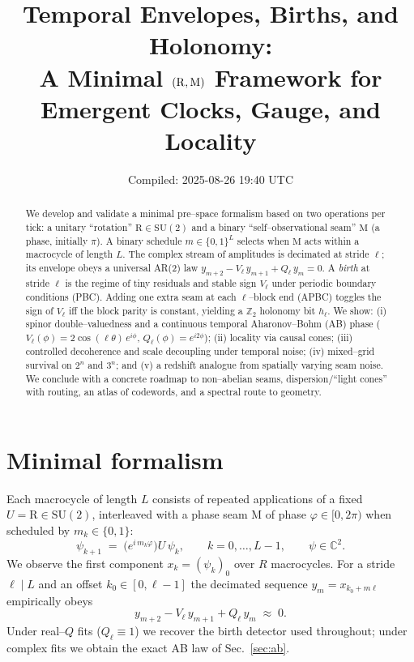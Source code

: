 \documentclass[11pt]{article}
\title{\bf Temporal Envelopes, Births, and Holonomy:\\
A Minimal $(\Rop,\Mop)$ Framework for Emergent Clocks, Gauge, and Locality}
\author{}
\date{Compiled: 2025-08-26 19:40 UTC}
\newcommand{\Z}{\mathbb{Z}}
\newcommand{\Rop}{\mathrm{R}}
\newcommand{\Mop}{\mathrm{M}}
\begin{document}
\maketitle

\begin{abstract}
We develop and validate a minimal pre--space formalism based on two operations per tick: a unitary ``rotation'' $\Rop\in \mathrm{SU}(2)$ and a binary ``self--observational seam'' $\Mop$ (a phase, initially $\pi$). A binary schedule $m\in\{0,1\}^L$ selects when $\Mop$ acts within a macrocycle of length $L$.
The complex stream of amplitudes is decimated at stride $\ell$; its envelope obeys a universal AR(2) law $y_{m+2}-V_\ell\,y_{m+1}+Q_\ell\,y_m=0$.
A \emph{birth} at stride $\ell$ is the regime of tiny residuals and stable sign $V_\ell$ under periodic boundary conditions (PBC). Adding one extra seam at each $\ell$--block end (APBC) toggles the sign of $V_\ell$ iff the block parity is constant, yielding a $\Z_2$ holonomy bit $h_\ell$.
We show: (i) spinor double--valuedness and a continuous temporal Aharonov--Bohm (AB) phase ($V_\ell(\phi)=2\cos(\ell\theta)\,e^{i\phi}$, $Q_\ell(\phi)=e^{i2\phi}$); (ii) locality via causal cones; (iii) controlled decoherence and scale decoupling under temporal noise; (iv) mixed--grid survival on $2^n$ and $3^n$; and (v) a redshift analogue from spatially varying seam noise.
We conclude with a concrete roadmap to non--abelian seams, dispersion/``light cones'' with routing, an atlas of codewords, and a spectral route to geometry.
\end{abstract}

\section{Minimal formalism}
Each macrocycle of length $L$ consists of repeated applications of a fixed $U=\Rop\in \mathrm{SU}(2)$, interleaved with a phase seam $\Mop$ of phase $\varphi\in[0,2\pi)$ when scheduled by $m_k\in\{0,1\}$:
\begin{equation}
\psi_{k+1} \;=\; \Big(e^{i\,m_k\varphi}\Big)U\,\psi_k,\qquad k=0,\dots,L-1,\qquad \psi\in\mathbb{C}^2.
\end{equation}
We observe the first component $x_k=(\psi_k)_0$ over $R$ macrocycles. For a stride $\ell\mid L$ and an offset $k_0\in[0,\ell-1]$ the decimated sequence $y_m=x_{k_0+m\ell}$ empirically obeys
\begin{equation}
y_{m+2} - V_\ell\,y_{m+1} + Q_\ell\,y_m \;\approx\; 0.
\end{equation}
Under real--$Q$ fits ($Q_\ell\equiv 1$) we recover the birth detector used throughout; under complex fits we obtain the exact AB law of Sec.~\ref{sec:ab}.
\end{document}
